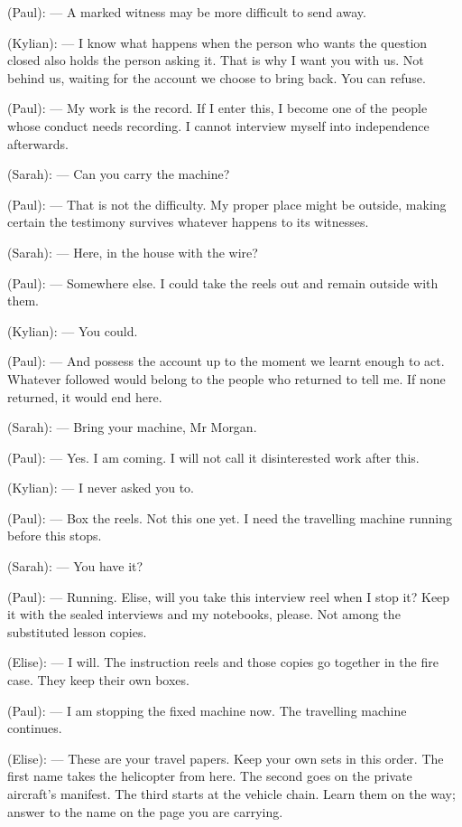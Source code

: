 \begin{room}
(Paul): --- A marked witness may be more difficult to send away.

(Kylian): --- I know what happens when the person who wants the question closed also holds the person asking it. That is why I want you with us. Not behind us, waiting for the account we choose to bring back. You can refuse.

(Paul): --- My work is the record. If I enter this, I become one of the people whose conduct needs recording. I cannot interview myself into independence afterwards.

(Sarah): --- Can you carry the machine?

(Paul): --- That is not the difficulty. My proper place might be outside, making certain the testimony survives whatever happens to its witnesses.

(Sarah): --- Here, in the house with the wire?

(Paul): --- Somewhere else. I could take the reels out and remain outside with them.

(Kylian): --- You could.

(Paul): --- And possess the account up to the moment we learnt enough to act. Whatever followed would belong to the people who returned to tell me. If none returned, it would end here.

(Sarah): --- Bring your machine, Mr Morgan.

(Paul): --- Yes. I am coming. I will not call it disinterested work after this.

(Kylian): --- I never asked you to.

(Paul): --- Box the reels. Not this one yet. I need the travelling machine running before this stops.

(Sarah): --- You have it?

(Paul): --- Running. Elise, will you take this interview reel when I stop it? Keep it with the sealed interviews and my notebooks, please. Not among the substituted lesson copies.

(Elise): --- I will. The instruction reels and those copies go together in the fire case. They keep their own boxes.

(Paul): --- I am stopping the fixed machine now. The travelling machine continues.

\centerline{}

(Elise): --- These are your travel papers. Keep your own sets in this order. The first name takes the helicopter from here. The second goes on the private aircraft's manifest. The third starts at the vehicle chain. Learn them on the way; answer to the name on the page you are carrying.


\end{room}
